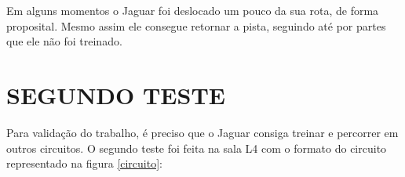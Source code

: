 	\begin{figure}[H]
		\centering
\end{figure}


Em alguns momentos o Jaguar foi deslocado um pouco da sua rota, de forma proposital. Mesmo assim ele consegue retornar a pista, seguindo até por partes que ele não foi treinado.

\section{SEGUNDO TESTE}
\label{segundo}

Para validação do trabalho, é preciso que o Jaguar consiga treinar e percorrer em outros circuitos. O segundo teste foi feita na sala L4 com o formato do circuito representado na figura \ref{circuito}:


